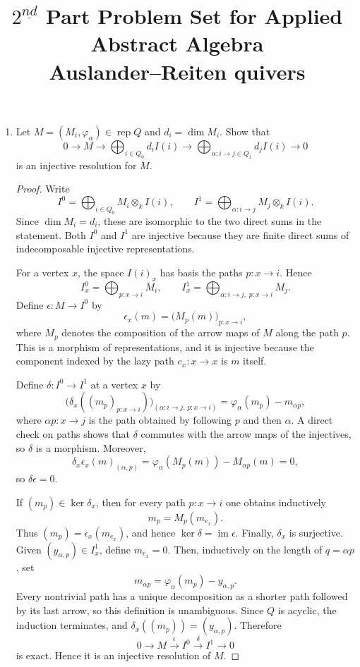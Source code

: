 \documentclass[11pt, a4paper]{article}
\title{\textbf{$2^{\underline{nd}}$ Part Problem Set for Applied Abstract Algebra}\\ Auslander--Reiten quivers}
\author{}
\date{}
\newcommand{\rep}{\operatorname{rep}}
\newcommand{\im}{\operatorname{im}}
\begin{document}
\maketitle

\begin{enumerate}[leftmargin=*, label=\textbf{\arabic*.}]

\item Let $M=(M_i,\varphi_\alpha)\in \rep Q$ and $d_i=\dim M_i$. Show that
\[
0\longrightarrow M\longrightarrow \bigoplus_{i\in Q_0}d_iI(i)
\longrightarrow \bigoplus_{\alpha:i\to j\in Q_1}d_jI(i)\longrightarrow 0
\]
is an injective resolution for $M$.

\begin{proof}
Write
\[
I^0=\bigoplus_{i\in Q_0}M_i\otimes_k I(i),
\qquad
I^1=\bigoplus_{\alpha:i\to j}M_j\otimes_k I(i).
\]
Since $\dim M_i=d_i$, these are isomorphic to the two direct sums in the statement.
Both $I^0$ and $I^1$ are injective because they are finite direct sums of indecomposable injective representations.

For a vertex $x$, the space $I(i)_x$ has basis the paths $p:x\to i$. Hence
\[
I^0_x=\bigoplus_{p:x\to i}M_i,
\qquad
I^1_x=\bigoplus_{\alpha:i\to j,\;p:x\to i}M_j.
\]
Define $\epsilon:M\to I^0$ by
\[
\epsilon_x(m)=\bigl(M_p(m)\bigr)_{p:x\to i},
\]
where $M_p$ denotes the composition of the arrow maps of $M$ along the path $p$.
This is a morphism of representations, and it is injective because the component indexed by the lazy path $e_x:x\to x$ is $m$ itself.

Define $\delta:I^0\to I^1$ at a vertex $x$ by
\[
\bigl(\delta_x((m_p)_{p:x\to i})\bigr)_{(\alpha:i\to j,\,p:x\to i)}
=
\varphi_\alpha(m_p)-m_{\alpha p},
\]
where $\alpha p:x\to j$ is the path obtained by following $p$ and then $\alpha$.
A direct check on paths shows that $\delta$ commutes with the arrow maps of the injectives, so $\delta$ is a morphism.
Moreover,
\[
\delta_x\epsilon_x(m)_{(\alpha,p)}
=\varphi_\alpha(M_p(m))-M_{\alpha p}(m)=0,
\]
so $\delta\epsilon=0$.

If $(m_p)\in\ker\delta_x$, then for every path $p:x\to i$ one obtains inductively
\[
 m_p=M_p(m_{e_x}).
\]
Thus $(m_p)=\epsilon_x(m_{e_x})$, and hence $\ker\delta=\im\epsilon$.
Finally, $\delta_x$ is surjective. Given
$(y_{\alpha,p})\in I^1_x$, define $m_{e_x}=0$. Then, inductively on the length
of $q=\alpha p$, set
\[
m_{\alpha p}=\varphi_\alpha(m_p)-y_{\alpha,p}.
\]
Every nontrivial path has a unique decomposition as a shorter path followed by
its last arrow, so this definition is unambiguous. Since $Q$ is acyclic, the
induction terminates, and $\delta_x((m_p))=(y_{\alpha,p})$. Therefore
\[
0\to M\xrightarrow{\epsilon}I^0\xrightarrow{\delta}I^1\to 0
\]
is exact. Hence it is an injective resolution of $M$.
\end{proof}


\end{enumerate}
\end{document}
